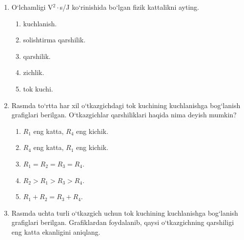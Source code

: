 \begin{enumerate}
\item O‘lchamligi V$^2\cdot$s/J ko‘rinishida bo‘lgan fizik kattalikni ayting.
\begin{enumerate}[label=\Alph*)]
\item kuchlanish.
\item solishtirma qarshilik.
\item qarshilik.
\item zichlik.
\item tok kuchi.
\end{enumerate}

\item Rasmda to‘rtta har xil o‘tkazgichdagi tok kuchining kuchlanishga bog‘lanish grafiglari berilgan. O‘tkazgichlar qarshiliklari haqida nima deyish mumkin?


\begin{enumerate}[label=\Alph*)]
\item $R_1$ eng katta, $R_4$ eng kichik.
\item $R_4$ eng katta, $R_1$ eng kichik.
\item $R_1=R_2=R_3=R_4$.
\item $R_2>R_1>R_3>R_4$.
\item $R_1+R_2=R_3+R_4$.
\end{enumerate}

\item Rasmda uchta turli o‘tkazgich uchun tok kuchining kuchlanishga bog‘lanish grafiglari berilgan. Grafiklardan foydalanib, qaysi o‘tkazgichning qarshiligi eng katta ekanligini aniqlang.

\end{enumerate}
